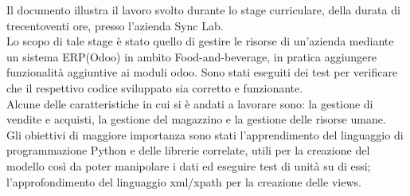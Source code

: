 
Il documento illustra il lavoro svolto durante lo stage curriculare, della durata di trecentoventi ore, presso l’azienda Sync Lab.\\
Lo scopo di tale stage è stato quello di gestire le risorse di un'azienda mediante un sistema ERP(Odoo) in ambito Food-and-beverage, in pratica aggiungere funzionalità aggiuntive ai moduli odoo.
Sono stati eseguiti dei test per verificare che il respettivo codice sviluppato sia corretto e funzionante.\\
Alcune delle caratteristiche in cui si è andati a lavorare sono: la gestione di vendite e acquisti, la gestione del magazzino e la gestione delle risorse umane.
\newline
\\
Gli obiettivi di maggiore importanza sono stati l'apprendimento del linguaggio di programmazione Python e delle librerie correlate, utili per la creazione del modello così da poter manipolare i dati ed eseguire test di unità su di essi; l'approfondimento del linguaggio xml/xpath per la creazione delle views.
